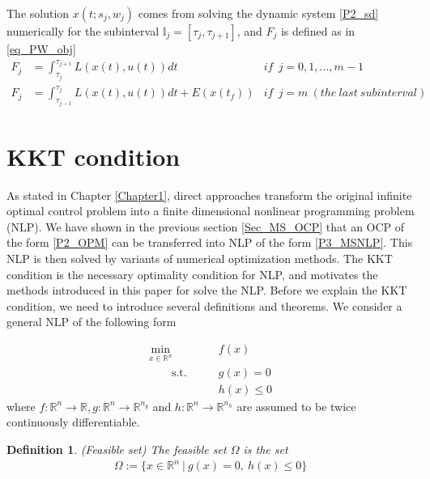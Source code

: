 \documentclass  [
  paper    = a4,
  BCOR     = 10mm,
  twoside,
  fontsize = 12pt,
  fleqn,
  toc      = bibnumbered,
  toc      = listofnumbered,
  numbers  = noendperiod,
  headings = normal,
  listof   = leveldown,
  version  = 3.03
]                                       {scrreprt}
\newcommand{\<}{\langle}
\renewcommand{\>}{\rangle}
\newtheorem{definition}{Definition}
\begin{document}
The  solution  $x(t; s_j, w_j)$ comes from solving the dynamic system \ref{P2_sd} numerically for the subinterval  $\mathbb{I}_j =[\tau_j, \tau_{j+1}]$,  and $F_j$ is defined as in \ref{eq_PW_obj}
\begin{equation}\label{eq_PW_obj}
	\begin{aligned}
		F_j &= \int_{\tau_{j}}^{\tau_{j+1}}L(x(t), u(t))dt   &if \ \   j= 0, 1, ..., m-1 \\ 
		F_j  & = \int_{\tau_{j-1}}^{\tau_j}L(x(t), u(t))dt + E (x(t_f)) &if\ \   j =m  \ (the\  last\  subinterval)
	\end{aligned}
\end{equation}

\section{KKT condition}
\label{Sec_KKT}
As stated in Chapter \ref{Chapter1}, direct approaches transform the original infinite optimal control problem into a finite dimensional nonlinear programming problem (NLP). We have shown in the previous section \ref{Sec_MS_OCP} that an OCP of the form \ref{P2_OPM} can be transferred into NLP of the form \ref{P3_MSNLP}. This NLP is then solved by variants of numerical optimization methods. The KKT condition is the necessary optimality condition for NLP, and motivates the methods introduced in this paper for solve the NLP. Before we explain the KKT condition, we need to introduce several definitions and theorems. We consider a general NLP of the following form
 

\begin{equation}
	\label{eq:OCP_discret_compact}
	\begin{aligned}
		\underset{x \in \mathbb{R}^n}{\text{min}} \qquad &f(x)\\
		\qquad \text{s.t.}\qquad&  g(x) = 0   \\
		&  h(x)\leq 0 
	\end{aligned}
\end{equation}
where $f: \mathbb{R}^n \rightarrow \mathbb{R}, g: \mathbb{R}^n \rightarrow \mathbb{R}^{n_g}$ and $h: \mathbb{R}^n \rightarrow \mathbb{R}^{n_h}$ are assumed to be twice continuously differentiable.

\begin{definition}(Feasible set) The feasible set $\Omega$ is the set 
	\begin{align}
		\Omega:= \{x \in \mathbb{R}^n \ | \ g(x)= 0 , \ h(x)\leq 0 \}
	\end{align}
\end{definition}
\end{document}
